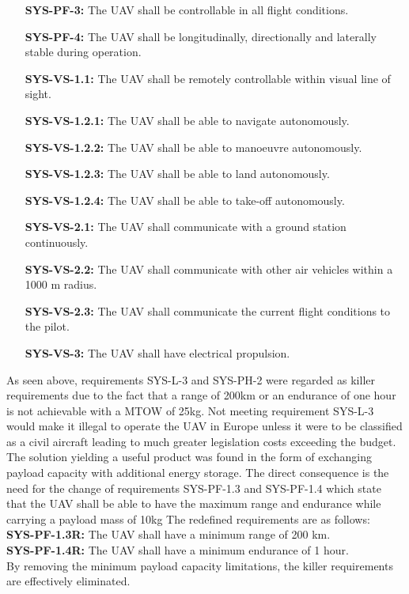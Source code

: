 \begin{enumerate}[leftmargin =4.5cm, align=parleft, labelwidth=10em]
    \item[\textbf{SYS-PF-3:}] The UAV shall be controllable in all flight conditions.
	\item[\textbf{SYS-PF-4:}] The UAV shall be longitudinally, directionally and laterally stable during operation.
    \item[\textbf{SYS-VS-1.1:}] The UAV shall be remotely controllable within visual line of sight.
    \item[\textbf{SYS-VS-1.2.1:}] The UAV shall be able to navigate  autonomously.
    \item[\textbf{SYS-VS-1.2.2:}] The UAV shall be able to manoeuvre autonomously.
    \item[\textbf{SYS-VS-1.2.3:}] The UAV shall be able to land autonomously.
    \item[\textbf{SYS-VS-1.2.4:}] The UAV shall be able to take-off autonomously.
	\item[\textbf{SYS-VS-2.1:}] The UAV shall communicate with a ground station continuously.
	\item[\textbf{SYS-VS-2.2:}] The UAV shall communicate with other air vehicles within a 1000 m radius.
	\item[\textbf{SYS-VS-2.3:}] The UAV shall communicate the current flight conditions to the pilot.
	\item[\textbf{SYS-VS-3:}] The UAV shall have electrical propulsion.
\end{enumerate}

As seen above, requirements SYS-L-3 and SYS-PH-2 were regarded as killer requirements due to the fact that a range of 200km or an endurance of one hour is not achievable with a MTOW of 25kg. Not meeting requirement SYS-L-3 would make it illegal to operate the UAV in Europe unless it were to be classified as a civil aircraft leading to much greater legislation costs exceeding the budget. The solution yielding a useful product was found in the form of exchanging payload capacity with additional energy storage. The direct consequence is the need for the change of requirements SYS-PF-1.3 and SYS-PF-1.4 which state that the UAV shall be able to have the maximum range and endurance while carrying a payload mass of 10kg The redefined requirements are as follows:\\

\noindent \textbf{SYS-PF-1.3R:} The UAV shall have a minimum range of 200 km.\\

\noindent \textbf{SYS-PF-1.4R:} The  UAV  shall  have  a  minimum  endurance  of  1  hour.\\

By removing the minimum payload capacity limitations, the killer requirements are effectively eliminated.